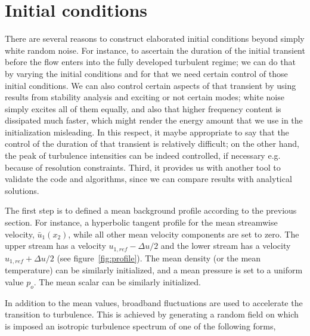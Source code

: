 \section{Initial conditions}

There are several reasons to construct elaborated initial conditions beyond
simply white random noise. For instance, to ascertain the duration of the
initial transient before the flow enters into the fully developed turbulent
regime; we can do that by varying the initial conditions and for that we need
certain control of those initial conditions. We can also control certain aspects
of that transient by using results from stability analysis and exciting or not
certain modes; white noise simply excites all of them equally, and also that
higher frequency content is dissipated much faster, which might render the
energy amount that we use in the initialization misleading. In this respect, it
maybe appropriate to say that the control of the duration of that transient is
relatively difficult; on the other hand, the peak of turbulence intensities can
be indeed controlled, if necessary e.g. because of resolution
constraints. Third, it provides us with another tool to validate the code and
algorithms, since we can compare results with analytical solutions.

The first step is to defined a mean background profile according to the
previous section. For instance, a hyperbolic tangent profile for the mean
streamwise velocity, $\bar{u}_1(x_2)$, while all other mean velocity components
are set to zero.  The upper stream has a velocity $u_{1,ref}-\Delta u/2$ and the
lower stream has a velocity $u_{1,ref}+\Delta u/2$ (see
figure~\ref{fig:profile}). The mean density (or the mean temperature) can be
similarly initialized, and a mean pressure is set to a uniform value $p_o$. The
mean scalar can be similarly initialized.

In addition to the mean values, broadband fluctuations are used to accelerate
the transition to turbulence. This is achieved by generating a random field on
which is imposed an isotropic turbulence spectrum of one of the following forms,

